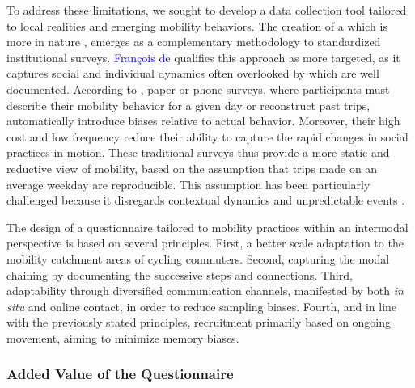 \begin{refsegment}
To address these limitations, we sought to develop a data collection tool tailored to local realities and emerging mobility behaviors. The creation of a  which is more  in nature \textcolor{blue}{\autocite[42]{singly_questionnaire_2016}}, emerges as a complementary methodology to standardized institutional surveys. \textcolor{blue}{François de} \textcolor{blue}{\textcite[42]{singly_questionnaire_2016}} qualifies this approach as more targeted, as it captures social and individual dynamics often overlooked by  which are well documented. According to \textcolor{blue}{\textcite[8]{armoogum_rapport_2018}}, paper or phone surveys, where participants must describe their mobility behavior for a given day or reconstruct past trips, automatically introduce biases relative to actual behavior. Moreover, their high cost and low frequency reduce their ability to capture the rapid changes in social practices in motion. These traditional surveys thus provide a more static and reductive view of mobility, based on the assumption that trips made on an average weekday are reproducible. This assumption has been particularly challenged because it disregards contextual dynamics and unpredictable events \textcolor{blue}{\autocite{madre_dynamiser_2004}}.%

The design of a questionnaire tailored to mobility practices within an intermodal perspective is based on several principles. First, a better scale adaptation to the mobility catchment areas of cycling commuters. Second, capturing the modal chaining by documenting the successive steps and connections. Third, adaptability through diversified communication channels, manifested by both \textsl{in situ} and online contact, in order to reduce sampling biases. Fourth, and in line with the previously stated principles, recruitment primarily based on ongoing movement, aiming to minimize memory biases.%

\subsubsection*{Added Value of the Questionnaire
    \label{chap3:apports-questionnaire-usagers-plus-value}
    }


\end{refsegment}
